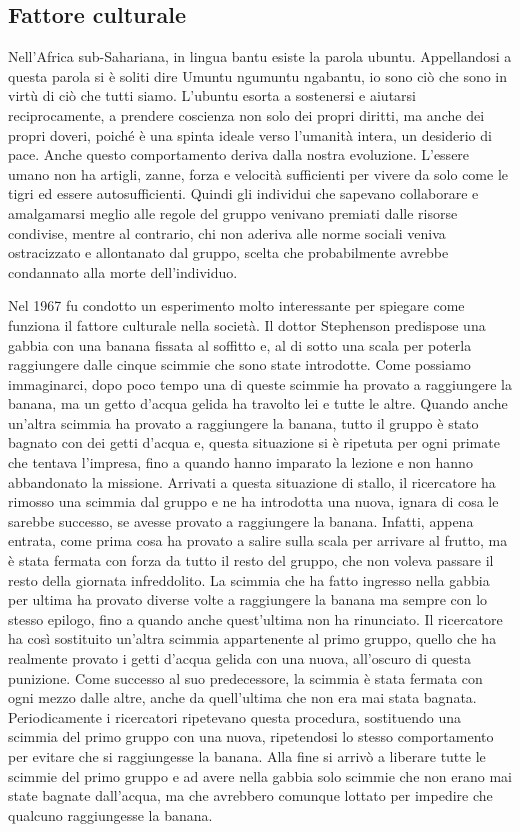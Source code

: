 \documentclass[12pt]{book} %
\begin{document}
\subsection{Fattore culturale}
Nell'Africa sub-Sahariana, in lingua bantu esiste la parola ubuntu. Appellandosi a questa parola si è soliti dire Umuntu
ngumuntu ngabantu, {\textquotedbl}io sono ciò che sono in virtù di ciò che tutti siamo{\textquotedbl}. L'ubuntu esorta
a sostenersi e aiutarsi reciprocamente, a prendere coscienza non solo dei propri diritti, ma anche dei propri doveri,
poiché è una spinta ideale verso l'umanità intera, un desiderio di
pace. Anche questo comportamento deriva dalla nostra
evoluzione. L'essere umano non ha artigli, zanne, forza e velocità sufficienti per vivere da solo
come le tigri ed essere autosufficienti. Quindi gli individui che sapevano collaborare e amalgamarsi meglio alle regole
del gruppo venivano premiati dalle risorse condivise, mentre al contrario, chi non aderiva alle norme sociali veniva
ostracizzato e allontanato dal gruppo, scelta che probabilmente avrebbe condannato alla morte
dell'individuo. 

Nel 1967 fu condotto un esperimento molto interessante per spiegare come funziona il fattore culturale nella società. Il
dottor Stephenson predispose una gabbia con una banana fissata al soffitto e, al di sotto una scala per poterla
raggiungere dalle cinque scimmie che sono state introdotte. Come possiamo immaginarci, dopo poco tempo una di queste
scimmie ha provato a raggiungere la banana, ma un getto d'acqua gelida ha travolto lei e tutte le
altre. Quando anche un'altra scimmia ha provato a raggiungere la banana, tutto il gruppo è stato
bagnato con dei getti d'acqua e, questa situazione si è ripetuta per ogni primate che tentava
l'impresa, fino a quando hanno imparato la lezione e non hanno abbandonato la missione. Arrivati a
questa situazione di stallo, il ricercatore ha rimosso una scimmia dal gruppo e ne ha introdotta una nuova, ignara di
cosa le sarebbe successo, se avesse provato a raggiungere la banana. Infatti, appena entrata, come prima cosa ha
provato a salire sulla scala per arrivare al frutto, ma è stata fermata con forza da tutto il resto del gruppo, che non
voleva passare il resto della giornata infreddolito. La scimmia che ha fatto ingresso nella gabbia per ultima ha
provato diverse volte a raggiungere la banana ma sempre con lo stesso epilogo, fino a quando anche
quest'ultima non ha rinunciato. Il ricercatore ha così sostituito un'altra
scimmia appartenente al primo gruppo, quello che ha realmente provato i getti d'acqua gelida con
una nuova, all'oscuro di questa punizione. Come successo al suo predecessore, la scimmia è stata
fermata con ogni mezzo dalle altre, anche da quell'ultima che non era mai stata bagnata.
Periodicamente i ricercatori ripetevano questa procedura, sostituendo una scimmia del primo gruppo con una nuova,
ripetendosi lo stesso comportamento per evitare che si raggiungesse la banana. Alla fine si arrivò a liberare tutte le
scimmie del primo gruppo e ad avere nella gabbia solo scimmie che non erano mai state bagnate
dall'acqua, ma che avrebbero comunque lottato per impedire che qualcuno raggiungesse la banana.
\end{document}

